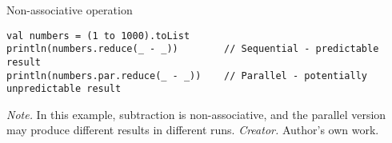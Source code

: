 \begin{table}[h!]
\caption{Non-associative operation}
\begin{lstlisting}
val numbers = (1 to 1000).toList
println(numbers.reduce(_ - _))        // Sequential - predictable result
println(numbers.par.reduce(_ - _))    // Parallel - potentially unpredictable result
\end{lstlisting}
\small
\textit{Note.} In this example, subtraction is non-associative, and the parallel version may produce different results in different runs.
\textit{Creator.} Author's own work.
\end{table}